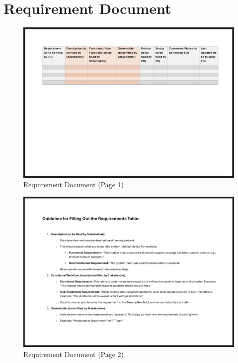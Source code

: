 \section{Requirement Document}\label{sec:requirement-document}
\begin{figure}[H]
    \centering
    \caption[]{Requirement Document (Page 1)}
    \label{fig:requirement-document-1}
    \includegraphics[width=1\textwidth]{abbildungen/RE/Word/RequirementDocument1}
\end{figure}
\begin{figure}[H]
    \centering
    \caption[]{Requirement Document (Page 2)}
    \label{fig:requirement-document-2}
    \includegraphics[width=1\textwidth]{abbildungen/RE/Word/RequirementDocument2}
\end{figure}

